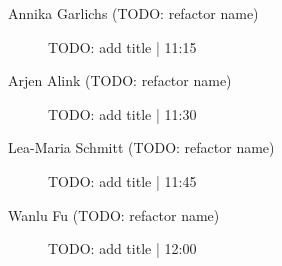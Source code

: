 \begin{symposium}
\begin{description}
                \item [Annika Garlichs (TODO: refactor name)] TODO: add title \textcolor{mygray}{ | 11:15}    
                
                \item [Arjen Alink (TODO: refactor name)] TODO: add title \textcolor{mygray}{ | 11:30}    
                
                \item [Lea-Maria Schmitt (TODO: refactor name)] TODO: add title \textcolor{mygray}{ | 11:45}    
                
                \item [Wanlu Fu  (TODO: refactor name)] TODO: add title \textcolor{mygray}{ | 12:00}    
                
            \end{description} 
            \end{symposium}
            